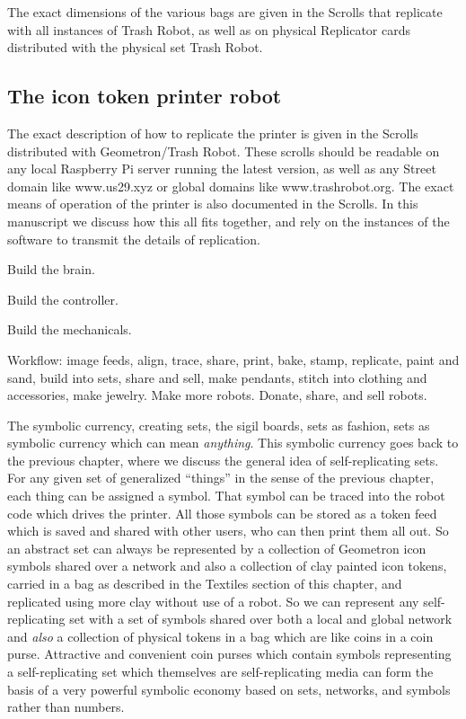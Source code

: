 The exact dimensions of the various bags are given in the Scrolls that replicate with all instances of Trash Robot, as well as on physical Replicator cards distributed with the physical set Trash Robot. 


\subsection{The icon token printer robot}

The exact description of how to replicate the printer is given in the Scrolls distributed with Geometron/Trash Robot. These scrolls should be readable on any local Raspberry Pi server running the latest version, as well as any Street domain like www.us29.xyz or global domains like www.trashrobot.org.  The exact means of operation of the printer is also documented in the Scrolls.  In this manuscript we discuss how this all fits together, and rely on the instances of the software to transmit the details of replication.

Build the brain. 

Build the controller. 

Build the mechanicals.  

Workflow:  image feeds, align, trace, share, print, bake, stamp, replicate, paint and sand, build into sets, share and sell, make pendants, stitch into clothing and accessories, make jewelry. Make more robots. Donate, share, and sell robots. 

The symbolic currency, creating sets, the sigil boards, sets as fashion, sets as symbolic currency which can mean \emph{anything}.  This symbolic currency goes back to the previous chapter, where we discuss the general idea of self-replicating sets. For any given set of generalized ``things'' in the sense of the previous chapter, each thing can be assigned a symbol.  That symbol can be traced into the robot code which drives the printer.  All those symbols can be stored as a token feed which is saved and shared with other users, who can then print them all out.  So an abstract set can always be represented by a collection of Geometron icon symbols shared over a network and also a collection of clay painted icon tokens, carried in a bag as described in the Textiles section of this chapter, and replicated using more clay without use of a robot.  So we can represent any self-replicating set with a set of symbols shared over both a local and global network and \emph{also} a collection of physical tokens in a bag which are like coins in a coin purse. Attractive and convenient coin purses which contain symbols representing a self-replicating set which themselves are self-replicating media can form the basis of a very powerful symbolic economy based on sets, networks, and symbols rather than numbers.  

